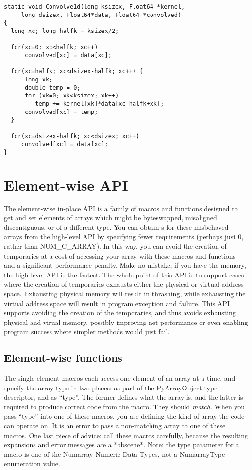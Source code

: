 \begin{verbatim}
static void Convolve1d(long ksizex, Float64 *kernel, 
     long dsizex, Float64*data, Float64 *convolved) 
{ 
  long xc; long halfk = ksizex/2;

  for(xc=0; xc<halfk; xc++)
      convolved[xc] = data[xc];
  
  for(xc=halfk; xc<dsizex-halfk; xc++) {
      long xk;
      double temp = 0;
      for (xk=0; xk<ksizex; xk++)
         temp += kernel[xk]*data[xc-halfk+xk];
      convolved[xc] = temp;
  }
  
  for(xc=dsizex-halfk; xc<dsizex; xc++)
     convolved[xc] = data[xc];
}
\end{verbatim}

\section{Element-wise API}
\label{sec:C-API:element-wise-api}

The element-wise in-place API is a family of macros and functions designed to
get and set elements of arrays which might be byteswapped, misaligned,
discontiguous, or of a different type.  You can obtain s
for these misbehaved arrays from the high-level API by specifying fewer
requirements (perhaps just 0, rather than NUM_C_ARRAY).  In this way, you can
avoid the creation of temporaries at a cost of accessing your array with these
macros and functions and a significant performance penalty.  Make no mistake,
if you have the memory, the high level API is the fastest.  The whole point of
this API is to support cases where the creation of temporaries exhausts either
the physical or virtual address space.  Exhausting physical memory will result
in thrashing, while exhausting the virtual address space will result in program
exception and failure.  This API supports avoiding the creation of the
temporaries, and thus avoids exhausting physical and virual memory, possibly
improving net performance or even enabling program success where simpler
methods would just fail.

\subsection{Element-wise functions}
\label{sec:C-API:element-wise:functions}

The single element macros each access one element of an array at a time, and
specify the array type in two places: as part of the PyArrayObject type
descriptor, and as ``type''.  The former defines what the array is, and the
latter is required to produce correct code from the macro.  They should
\emph{match}.  When you pass ``type'' into one of these macros, you are
defining the kind of array the code can operate on.  It is an error to pass a
non-matching array to one of these macros.  One last piece of advice: call
these macros carefully, because the resulting expansions and error messages are
a *obscene*.  Note: the type parameter for a macro is one of the Numarray
Numeric Data Types, not a NumarrayType enumeration value.

